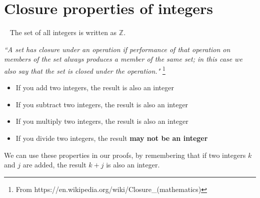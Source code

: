 \documentclass[a4paper,12pt]{book}
\newcounter{question}
\begin{document}
\begin{questionNOGRADE}{\thequestion}
        \end{questionNOGRADE}

    \newpage

    \section*{Closure properties of integers}

        \begin{intro}{\ }
            The set of all integers is written as $\mathbb{Z}$.

            \begin{center}
                \textit{``A set has closure under an operation if
                performance of that operation on members of the set
                always produces a member of the same set; in this
                case we also say that the set is closed under the operation."}
                \footnote{From https://en.wikipedia.org/wiki/Closure\_(mathematics)}
            \end{center}

            \begin{itemize}
                \item   If you add two integers, the result is also an integer
                \item   If you subtract two integers, the result is also an integer
                \item   If you multiply two integers, the result is also an integer
                \item   If you divide two integers, the result \textbf{may not be an integer}
            \end{itemize}

            We can use these properties in our proofs, by remembering that
            if two integers $k$ and $j$ are added, the result $k+j$ is also an integer.
        \end{intro}
\end{document}
